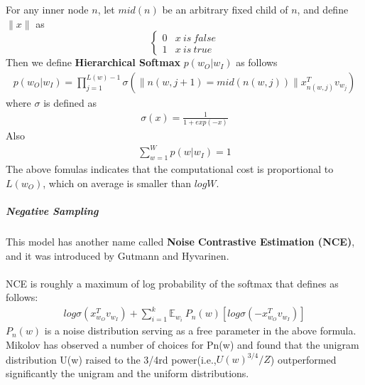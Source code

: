 \documentclass[paper=a4, fontsize=12pt]{scrartcl}
\begin{document}
For any inner node $n$, let $mid(n)$ be an arbitrary fixed child of $n$, and define $\| x \|$ as
\[ \begin{cases} 
      0 & x \ is \  false\\
      1 & x \ is \ true
   \end{cases}
\]
Then we define \textbf{Hierarchical Softmax} $p(w_O | w_I)$ as follows
\begin{align*}
p(w_O | w_I) = \prod^{L(w)-1}_{j = 1} \sigma ( \| n(w, j + 1) = mid(n(w, j))\| x_{n(w, j)}^{T} v_{w_j} )
\end{align*}
where $\sigma$ is defined as
\begin{align*}
\sigma(x) = \frac{1}{1 + exp(-x)}
\end{align*}
Also
\begin{align*}
\sum^W_{w = 1} p(w | w_I) = 1
\end{align*}
The above fomulas indicates that the computational cost is proportional to $L(w_O)$, which on average is smaller than $logW$.
\subparagraph{Negative Sampling} This model has another name called \textbf{Noise Contrastive Estimation (NCE)}, and it was introduced by Gutmann and Hyvarinen.\\\\
NCE is roughly a maximum of log probability of the softmax that defines as follows:
\begin{align*}
log \sigma (x_{w_O}^{T} v_{w_I}) + \sum^{k}_{i = 1} \mathbb{E}_{w_i}~P_n(w) [log \sigma (-x_{w_O}^{T} v_{w_I}) ]
\end{align*}
$P_n(w)$ is a noise distribution serving as a free parameter in the above formula. 
Mikolov has observed a number
of choices for Pn(w) and found that the unigram distribution U(w) raised to the 3/4rd power(i.e.,$U(w)^{3/4}/Z$) outperformed significantly the unigram and the uniform distributions.
\end{document}
